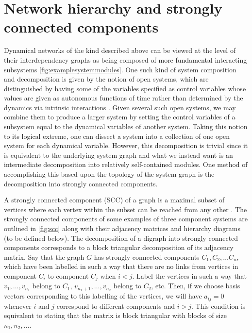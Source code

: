 \section{Network hierarchy and strongly connected components}

Dynamical networks of the kind described above can be viewed at the level of their interdependency graphs as being composed of more fundamental interacting subsystems \ref{fig:examplesystemmodules}. One such kind of system composition and decomposition is given by the notion of open systems, which are distinguished by having some of the variables specified as control variables whose values are given as autonomous functions of time rather than determined by the dynamics via intrinsic interactions \cite{Vagner2014}.  Given several such open systems, we may combine them to produce a larger system by setting the control variables of a subsystem equal to the dynamical variables of another system.  Taking this notion to its logical extreme, one can dissect a system into a collection of one open system for each dynamical variable.  However, this decomposition is trivial since it is equivalent to the underlying system graph and what we instead want is an intermediate decomposition into relatively self-contained modules.  One method of accomplishing this based upon the topology of the system graph is the decomposition into strongly connected components.

A strongly connected component (SCC) of a graph is a maximal subset of vertices where each vertex within the subset can be reached from any other \cite{Cormen2009}. The strongly connected components of some examples of three component systems are outlined in \ref{fig:scc} along with their adjacency matrices and hierarchy diagrams (to be defined below).
The decomposition of a digraph into strongly connected components corresponds to a block triangular decomposition of its adjacency matrix.  Say that the graph $G$ has strongly connected components $C_1, C_2, \ldots C_n$, which have been labelled in such a way that there are no links from vertices in component $C_i$ to component $C_j$ when $i < j$.  Label the vertices in such a way that $v_1, \ldots, v_{n_1}$ belong to $C_1$, $v_{n_1 + 1}, \ldots, v_{n_2}$ belong to $C_2$, etc.  Then, if we choose basis vectors corresponding to this labelling of the vertices, we will have $a_{ij} = 0$ whenever $i$ and $j$ correspond to different components and $i > j$.  This condition is equivalent to stating that the matrix is block triangular with blocks of size $n_1, n_2, \ldots$.

